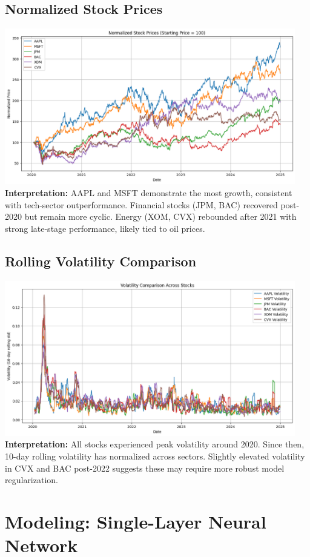 \documentclass[12pt]{article}
\begin{document}
\subsection{Normalized Stock Prices}
\includegraphics[width=0.95\textwidth]{normalized_stock_prices.png}
\textbf{Interpretation:} AAPL and MSFT demonstrate the most growth, consistent with tech-sector outperformance. Financial stocks (JPM, BAC) recovered post-2020 but remain more cyclic. Energy (XOM, CVX) rebounded after 2021 with strong late-stage performance, likely tied to oil prices.

\subsection{Rolling Volatility Comparison}
\includegraphics[width=0.95\textwidth]{volatility_comparison_across_stocks.png}
\textbf{Interpretation:} All stocks experienced peak volatility around 2020. Since then, 10-day rolling volatility has normalized across sectors. Slightly elevated volatility in CVX and BAC post-2022 suggests these may require more robust model regularization.
\section{Modeling: Single-Layer Neural Network}
\end{document}
